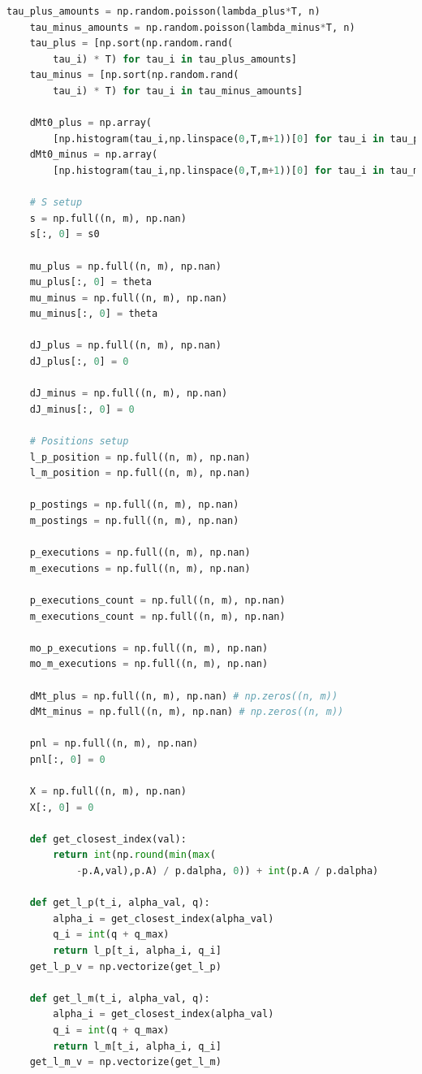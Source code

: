 \documentclass[12pt,a4paper,spanish]{article}%
\begin{document}
\begin{appendices}
\begin{lstlisting}[language=Python]
    tau_plus_amounts = np.random.poisson(lambda_plus*T, n)
    tau_minus_amounts = np.random.poisson(lambda_minus*T, n)
    tau_plus = [np.sort(np.random.rand(
    	tau_i) * T) for tau_i in tau_plus_amounts]
    tau_minus = [np.sort(np.random.rand(
    	tau_i) * T) for tau_i in tau_minus_amounts]

    dMt0_plus = np.array(
    	[np.histogram(tau_i,np.linspace(0,T,m+1))[0] for tau_i in tau_plus])
    dMt0_minus = np.array(
    	[np.histogram(tau_i,np.linspace(0,T,m+1))[0] for tau_i in tau_minus])

    # S setup
    s = np.full((n, m), np.nan)
    s[:, 0] = s0

    mu_plus = np.full((n, m), np.nan)
    mu_plus[:, 0] = theta
    mu_minus = np.full((n, m), np.nan)
    mu_minus[:, 0] = theta

    dJ_plus = np.full((n, m), np.nan)
    dJ_plus[:, 0] = 0

    dJ_minus = np.full((n, m), np.nan)
    dJ_minus[:, 0] = 0

    # Positions setup
    l_p_position = np.full((n, m), np.nan)
    l_m_position = np.full((n, m), np.nan)

    p_postings = np.full((n, m), np.nan)
    m_postings = np.full((n, m), np.nan)

    p_executions = np.full((n, m), np.nan)
    m_executions = np.full((n, m), np.nan)

    p_executions_count = np.full((n, m), np.nan)
    m_executions_count = np.full((n, m), np.nan)

    mo_p_executions = np.full((n, m), np.nan)
    mo_m_executions = np.full((n, m), np.nan)

    dMt_plus = np.full((n, m), np.nan) # np.zeros((n, m))
    dMt_minus = np.full((n, m), np.nan) # np.zeros((n, m))

    pnl = np.full((n, m), np.nan)
    pnl[:, 0] = 0

    X = np.full((n, m), np.nan)
    X[:, 0] = 0

    def get_closest_index(val):
        return int(np.round(min(max(
        	-p.A,val),p.A) / p.dalpha, 0)) + int(p.A / p.dalpha)

    def get_l_p(t_i, alpha_val, q):
        alpha_i = get_closest_index(alpha_val)
        q_i = int(q + q_max)
        return l_p[t_i, alpha_i, q_i]
    get_l_p_v = np.vectorize(get_l_p)

    def get_l_m(t_i, alpha_val, q):
        alpha_i = get_closest_index(alpha_val)
        q_i = int(q + q_max)
        return l_m[t_i, alpha_i, q_i]
    get_l_m_v = np.vectorize(get_l_m)


\end{lstlisting}
\end{appendices}
\end{document}
